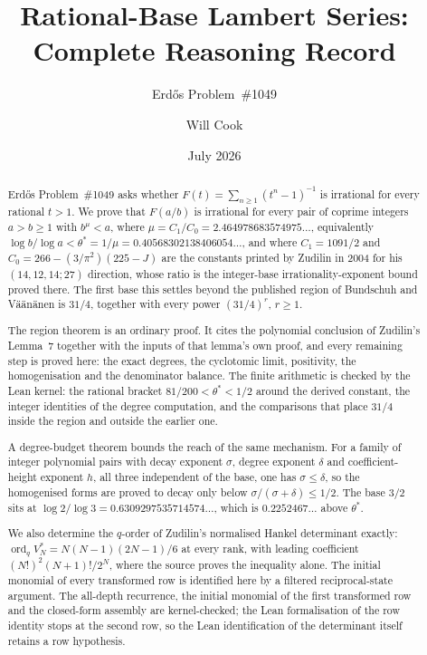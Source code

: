 \documentclass[11pt]{article}
\title{Rational-Base Lambert Series: Complete Reasoning Record}
\subtitle{Erd\H{o}s Problem~\#1049}
\author{Will Cook}
\date{July 2026}
\begin{document}
\maketitle
\noteprovenance

\begin{abstract}
\noindent
Erd\H{o}s Problem~\#1049 asks whether
\(F(t)=\sum_{n\ge1}(t^n-1)^{-1}\) is irrational for every rational \(t>1\).
We prove that \(F(a/b)\) is irrational for every pair of coprime integers
\(a>b\ge1\) with \(b^{\mu}<a\), where \(\mu=C_1/C_0=2.464978683574975\ldots\),
equivalently \(\log b/\log a<\theta^{*}=1/\mu=0.40568302138406054\ldots\), and
where \(C_1=1091/2\) and \(C_0=266-(3/\pi^{2})(225-J)\) are the constants
printed by Zudilin in 2004 for his \((14,12,14;27)\) direction, whose ratio is
the integer-base irrationality-exponent bound proved there.  The first base this settles beyond the
published region of Bundschuh and V\"a\"an\"anen is \(31/4\), together with
every power \((31/4)^{r}\), \(r\ge1\).

The region theorem is an ordinary proof.  It cites the polynomial conclusion of
Zudilin's Lemma~7 together with the inputs of that lemma's own proof, and every
remaining step is proved here: the exact degrees, the cyclotomic limit,
positivity, the homogenisation and the denominator balance.  The finite
arithmetic is checked by the Lean kernel: the rational bracket
\(81/200<\theta^{*}<1/2\) around the derived constant, the integer identities of
the degree computation, and the comparisons that place \(31/4\) inside the
region and outside the earlier one.

A degree-budget theorem bounds the reach of the same mechanism.  For a family
of integer polynomial pairs with decay exponent \(\sigma\), degree exponent
\(\delta\) and coefficient-height exponent \(h\), all three independent of the
base, one has \(\sigma\le\delta\), so the homogenised forms are proved to decay
only below \(\sigma/(\sigma+\delta)\le1/2\).  The base \(3/2\) sits at
\(\log2/\log3=0.6309297535714574\ldots\), which is \(0.2252467\ldots\) above
\(\theta^{*}\).

We also determine the \(q\)-order of Zudilin's normalised Hankel determinant
exactly: \(\operatorname{ord}_qV_N^{*}=N(N-1)(2N-1)/6\) at every rank, with
leading coefficient \((N!)^{2}(N+1)!/2^{N}\), where the source proves the
inequality alone.  The initial monomial of every transformed row is identified
here by a filtered reciprocal-state argument.  The all-depth recurrence, the
initial monomial of the first transformed row and the closed-form assembly are
kernel-checked; the Lean formalisation of the row identity stops at the second
row, so the Lean identification of the determinant itself retains a row
hypothesis.


\end{abstract}
\end{document}
